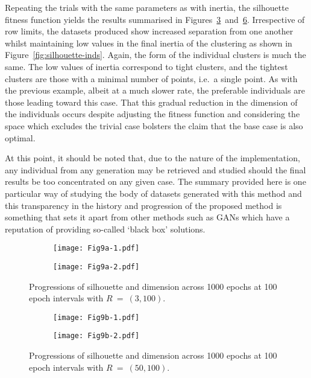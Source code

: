 Repeating the trials with the same parameters as with inertia, the silhouette
fitness function yields the results summarised in
Figures~\ref{fig:small-silhouette}~and~\ref{fig:large-silhouette}. Irrespective
of row limits, the datasets produced show increased separation from one another
whilst maintaining low values in the final inertia of the clustering as shown in
Figure~\ref{fig:silhouette-inds}. Again, the form of the individual clusters is
much the same. The low values of inertia correspond to tight clusters, and the
tightest clusters are those with a minimal number of points, i.e.\ a single
point. As with the previous example, albeit at a much slower rate, the
preferable individuals are those leading toward this case. That this gradual
reduction in the dimension of the individuals occurs despite adjusting the
fitness function and considering the space which excludes the trivial case
bolsters the claim that the base case is also optimal.

At this point, it should be noted that, due to the nature of the implementation,
any individual from any generation may be retrieved and studied should the final
results be too concentrated on any given case. The summary provided here is one
particular way of studying the body of datasets generated with this method and
this transparency in the history and progression of the proposed method is
something that sets it apart from other methods such as GANs which have a
reputation of providing so-called `black box' solutions.

\begin{figure}[htbp]
    \centering
    \begin{subfigure}{\imgwidth}
        \texttt{[image: Fig9a-1.pdf]}
        \caption{}\label{fig:edo:small:silhouette}
    \end{subfigure}

    \begin{subfigure}{\imgwidth}
        \texttt{[image: Fig9a-2.pdf]}
        \caption{}\label{fig:edo:small:dimension}
    \end{subfigure}
    \caption{%
        Progressions of silhouette and dimension across 1000 epochs at 100 epoch
        intervals with \(R~=~(3, 100)\).
    }\label{fig:small-silhouette}
\end{figure}

\begin{figure}
    \centering
    \begin{subfigure}{\imgwidth}
        \texttt{[image: Fig9b-1.pdf]}
        \caption{}\label{fig:edo:large:silhouette}
    \end{subfigure}

    \begin{subfigure}{\imgwidth}
        \texttt{[image: Fig9b-2.pdf]}
        \caption{}\label{fig:edo:large:dimension}
    \end{subfigure}
    \caption{%
        Progressions of silhouette and dimension across 1000 epochs at 100 epoch
        intervals with \(R~=~(50,100)\).
    }\label{fig:large-silhouette}
\end{figure}

